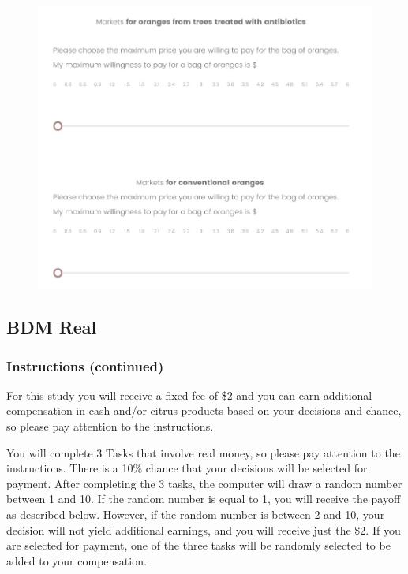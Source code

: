 \documentclass[12pt]{article}
\begin{document}
\begin{figure}[H]
    \centering
    \includegraphics[width=\linewidth]{BDM_market.jpg}
    \caption{}
    \label{fig:BDM_market}
\end{figure}

\clearpage



\subsection{BDM Real}


\subsubsection*{\textbf{Instructions (continued)}}


For this study you will receive a fixed fee of \$2 and you can earn additional compensation in cash and/or citrus products based on your decisions and chance, so please pay attention to the instructions.
 
You will complete 3 Tasks that involve real money, so please pay attention to the instructions. There is a 10\% chance that your decisions will be selected for payment. After completing the 3 tasks, the computer will draw a random number between 1 and 10. If the random number is equal to 1, you will receive the payoff as described below. However, if the random number is between 2 and 10, your decision will not yield additional earnings, and you will receive just the \$2. If you are selected for payment, one of the three tasks will be randomly selected to be added to your compensation.
\end{document}
